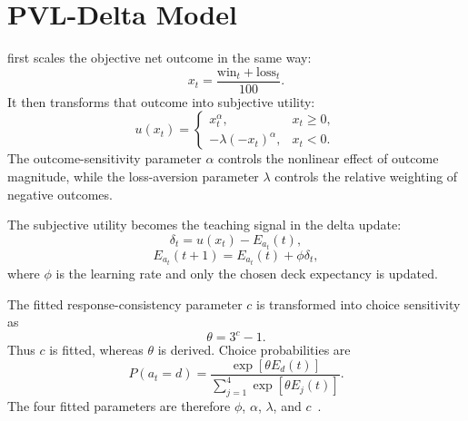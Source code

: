 \section{PVL-Delta Model}

\PVL{} first scales the objective net outcome in the same way:
\begin{equation}
    x_t=\frac{\mathrm{win}_t+\mathrm{loss}_t}{100}.
\end{equation}
It then transforms that outcome into subjective utility:
\begin{equation}
    u(x_t)=
    \begin{cases}
        x_t^{\alpha},            & x_t\ge 0, \\
        -\lambda(-x_t)^{\alpha}, & x_t<0.
    \end{cases}
\end{equation}
The outcome-sensitivity parameter \(\alpha\) controls the nonlinear effect of outcome magnitude, while the loss-aversion parameter \(\lambda\) controls the relative weighting of negative outcomes.

The subjective utility becomes the teaching signal in the delta update:
\begin{equation}
    \delta_t=u(x_t)-E_{a_t}(t),
\end{equation}
\begin{equation}
    E_{a_t}(t+1)=E_{a_t}(t)+\phi\delta_t,
\end{equation}
where \(\phi\) is the learning rate and only the chosen deck expectancy is updated.

The fitted response-consistency parameter \(c\) is transformed into choice sensitivity as
\begin{equation}
    \theta=3^c-1.
\end{equation}
Thus \(c\) is fitted, whereas \(\theta\) is derived. Choice probabilities are
\begin{equation}
    P(a_t=d)=\frac{\exp\left[\theta E_d(t)\right]}{\sum_{j=1}^{4}\exp\left[\theta E_j(t)\right]}.
\end{equation}
The four fitted parameters are therefore \(\phi\), \(\alpha\), \(\lambda\), and \(c\)~\cite{ahn2008}.
